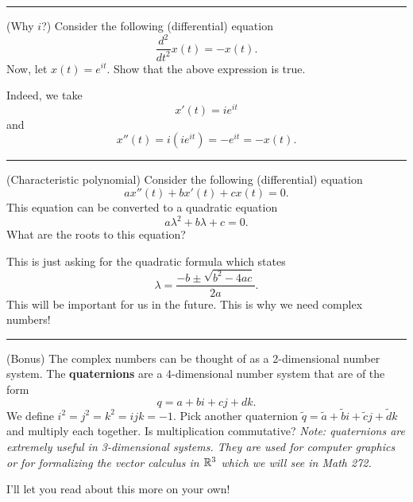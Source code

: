\documentclass[12pt]{article} %
\begin{document}
\hrule 
\begin{problem}
(Why $i$?) Consider the following (differential) equation
\[
\frac{d^2}{dt^2}x(t)=-x(t).
\]
Now, let $x(t)=e^{it}$.  Show that the above expression is true.
\end{problem}

\begin{solution}
Indeed, we take
\[
x'(t)=ie^{it}
\]
and
\[
x''(t)=i\left(ie^{it}\right)=-e^{it}=-x(t).
\]
\end{solution}

\hrule

\begin{problem}
(Characteristic polynomial) Consider the following (differential) equation
\[
ax''(t)+bx'(t)+cx(t)=0.
\]
This equation can be converted to a quadratic equation
\[
a\lambda^2 + b\lambda + c = 0.
\]
What are the roots to this equation?
\end{problem}

\begin{solution}
This is just asking for the quadratic formula which states
\[
\lambda = \frac{-b\pm \sqrt{b^2-4ac}}{2a}.
\]
This will be important for us in the future. This is why we need complex numbers!
\end{solution}


\hrule
\begin{problem}
(Bonus) The complex numbers can be thought of as a 2-dimensional number system. The \textbf{quaternions} are a 4-dimensional number system that are of the form
\[
q = a+bi+cj+dk.
\]
We define $i^2=j^2=k^2=ijk=-1$. Pick another quaternion $\tilde{q}=\tilde{a}+\tilde{b}i+\tilde{c}j+\tilde{d}k$ and multiply each together. Is multiplication commutative? \emph{Note: quaternions are extremely useful in 3-dimensional systems. They are used for computer graphics or for formalizing the vector calculus in $\mathbb{R}^3$ which we will see in Math 272.}
\end{problem}

\begin{solution}
I'll let you read about this more on your own!
\end{solution}
\end{document}
